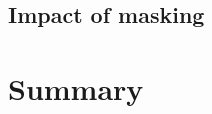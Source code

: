 \documentclass[letterpaper,11pt]{article}
\begin{document}
\subsection{Impact of masking}
\label{ssec:impact_of_masking}

\section{Summary}
\label{sec:summary}


\end{document}
